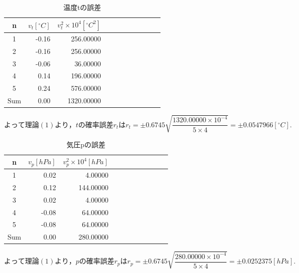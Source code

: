 \documentclass[a4paper,1pt]{jsarticle}
\begin{document}
\begin{table}[H]
  \caption{温度tの誤差}
  \label{table:SpeedOfLight}
  \centering
  \begin{tabular}{|c||r|r|r|r|r|r|r|r|r|r|}
    \hline
    n & $v_t[{}^\circ{C}]$ & $v_t^2\times 10^4[{}^\circ{C}^2]$ \\
    \hline\hline
    
    1 & -0.16 & 256.00000 \\
    2 & -0.16 & 256.00000 \\
    3 & -0.06 & 36.00000 \\
    4 & 0.14 & 196.00000 \\
    5 & 0.24 & 576.00000 \\
    

   
    
    \hline\hline
    Sum & 0.00 & 1320.00000 \\
    \hline
  \end{tabular}


\end{table}

$よって理論(1)より，tの確率誤差r_tはr_t=\pm0.6745\sqrt{\dfrac{1320.00000\times 10^{-4}}{5\times 4}}=\pm0.0547966[{}^\circ{C}].$\\

\begin{table}[H]
  \caption{気圧pの誤差}
  \label{table:SpeedOfLight}
  \centering
  \begin{tabular}{|c||r|r|r|r|r|r|r|r|r|r|}
    \hline
    n & $v_p[hPa]$ & $v_p^2\times 10^4[hPa]$ \\
    \hline\hline
    
    1 & 0.02 & 4.00000 \\
    2 & 0.12 & 144.00000 \\
    3 & 0.02 & 4.00000 \\
    4 & -0.08 & 64.00000 \\
    5 & -0.08 & 64.00000 \\
    

   
    
    \hline\hline
    Sum & 0.00 & 280.00000 \\
    \hline
  \end{tabular}


\end{table}

$よって理論(1)より，pの確率誤差r_pはr_p=\pm0.6745\sqrt{\dfrac{280.00000\times 10^{-4}}{5\times 4}}=\pm0.0252375[hPa].$\\
\end{document}
